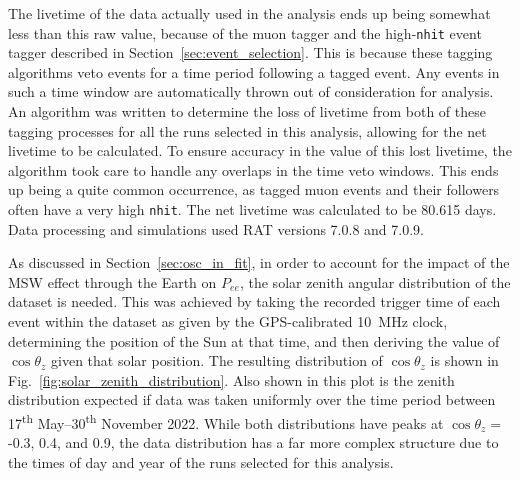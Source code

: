 The livetime of the data actually used in the analysis ends up being somewhat less than this raw value, because of the muon tagger and the high-\texttt{nhit} event tagger described in Section~\ref{sec:event_selection}. This is because these tagging algorithms veto events for a time period following a tagged event. Any events in such a time window are automatically thrown out of consideration for analysis. An algorithm was written to determine the loss of livetime from both of these tagging processes for all the runs selected in this analysis, allowing for the net livetime to be calculated. To ensure accuracy in the value of this lost livetime, the algorithm took care to handle any overlaps in the time veto windows. This ends up being a quite common occurrence, as tagged muon events and their followers often have a very high \texttt{nhit}. The net livetime was calculated to be 80.615 days. Data processing and simulations used RAT versions 7.0.8 and 7.0.9.

As discussed in Section~\ref{sec:osc_in_fit}, in order to account for the impact of the MSW effect through the Earth on $P_{ee}$, the solar zenith angular distribution of the dataset is needed. This was achieved by taking the recorded trigger time of each event within the dataset as given by the GPS-calibrated \SI{10}{\MHz} clock, determining the position of the Sun at that time, and then deriving the value of $\cos{\theta_{z}}$ given that solar position. The resulting distribution of $\cos{\theta_{z}}$ is shown in Fig.~\ref{fig:solar_zenith_distribution}. Also shown in this plot is the zenith distribution expected if data was taken uniformly over the time period between 17\textsuperscript{th} May--30\textsuperscript{th} November 2022. While both distributions have peaks at $\cos{\theta_{z}} =$ -0.3, 0.4, and 0.9, the data distribution has a far more complex structure due to the times of day and year of the runs selected for this analysis.

